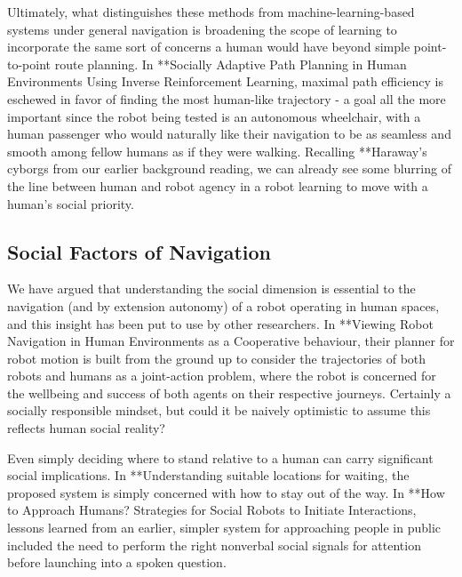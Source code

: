 \documentclass{sfuthesis}
\begin{document}
Ultimately, what distinguishes these methods from machine-learning-based systems under general navigation is broadening the scope of learning to incorporate the same sort of concerns a human would have beyond simple point-to-point route planning. In **Socially Adaptive Path Planning in Human Environments Using Inverse Reinforcement Learning, maximal path efficiency is eschewed in favor of finding the most human-like trajectory - a goal all the more important since the robot being tested is an autonomous wheelchair, with a human passenger who would naturally like their navigation to be as seamless and smooth among fellow humans as if they were walking. Recalling **Haraway's cyborgs from our earlier background reading, we can already see some blurring of the line between human and robot agency in a robot learning to move with a human's social priority.








\subsection{Social Factors of Navigation}	

We have argued that understanding the social dimension is essential to the navigation (and by extension autonomy) of a robot operating in human spaces, and this insight has been put to use by other researchers. In **Viewing Robot Navigation in Human Environments as a Cooperative behaviour, their planner for robot motion is built from the ground up to consider the trajectories of both robots and humans as a joint-action problem, where the robot is concerned for the wellbeing and success of both agents on their respective journeys. Certainly a socially responsible mindset, but could it be naively optimistic to assume this reflects human social reality?

Even simply deciding where to stand relative to a human can carry significant social implications. In **Understanding suitable locations for waiting, the proposed system is simply concerned with how to stay out of the way.	In **How to Approach Humans? Strategies for Social Robots to Initiate Interactions, lessons learned from an earlier, simpler system for approaching people in public included the need to perform the right nonverbal social signals for attention before launching into a spoken question.
\end{document}
